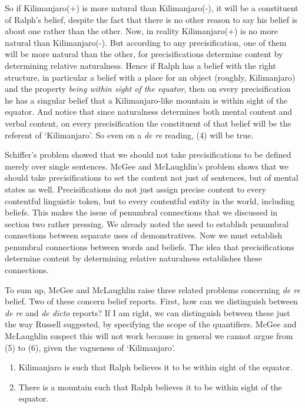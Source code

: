 So if Kilimanjaro(+) is more natural than Kilimanjaro(-), it will be a constituent of Ralph's belief, despite the fact that there is no other reason to say his belief is about one rather than the other. Now, in reality Kilimanjaro(+) is no more natural than Kilimanjaro(-). But according to any precisification, one of them will be more natural than the other, for precisifications determine content by determining relative naturalness. Hence if Ralph has a belief with the right structure, in particular a belief with a place for an object (roughly, Kilimanjaro) and the property \textit{being within sight of the equator}, then on every precisification he has a singular belief that a Kilimanjaro-like mountain is within sight of the equator. And notice that since naturalness determines both mental content and verbal content, on every precisification the constituent of that belief will be the referent of `Kilimanjaro'. So even on a \textit{de re} reading, (4) will be true.

Schiffer's problem showed that we should not take precisifications to be defined merely over single sentences. McGee and McLaughlin's problem shows that we should take precisifications to set the content not just of sentences, but of mental states as well. Precisifications do not just assign precise content to every contentful linguistic token, but to every contentful entity in the world, including beliefs. This makes the issue of penumbral connections that we discussed in section two rather pressing. We already noted the need to establish penumbral connections between separate uses of demonstratives. Now we must establish penumbral connections between words and beliefs. The idea that precisifications determine content by determining relative naturalness establishes these connections.

To sum up, McGee and McLaughlin raise three related problems concerning \textit{de re} belief. Two of these concern belief reports. First, how can we distinguish between \textit{de re }and \textit{de dicto} reports? If I am right, we can distinguish between these just the way Russell suggested, by specifying the scope of the quantifiers. McGee and McLaughlin suspect this will not work because in general we cannot argue from (5) to (6), given the vagueness of `Kilimanjaro'.

\begin{enumerate}
\renewcommand{\labelenumi}{(\arabic{enumi})}
\setcounter{enumi}{4}
\item Kilimanjaro is such that Ralph believes it to be within sight of the equator.
\item There is a mountain such that Ralph believes it to be within sight of the equator.
\end{enumerate}

